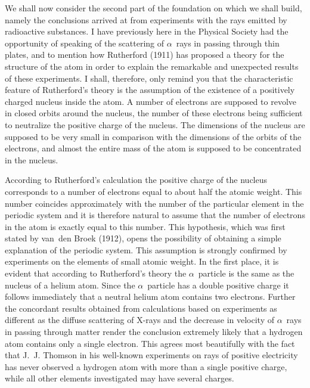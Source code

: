  We shall now consider the
second part of the foundation on which we shall build, namely the
conclusions arrived at from experiments with the rays emitted by
radioactive substances. I have previously here in the Physical
Society had the opportunity of speaking of the scattering of $\alpha$~rays
in passing through thin plates, and to mention how Rutherford
(1911) has proposed a theory for the structure of the atom in
order to explain the remarkable and unexpected results of these
experiments. I shall, therefore, only remind you that the characteristic
feature of Rutherford's theory is the assumption of the
existence of a positively charged nucleus inside the atom. A number
of electrons are supposed to revolve in closed orbits around the
nucleus, the number of these electrons being sufficient to neutralize
the positive charge of the nucleus. The dimensions of the nucleus
are supposed to be very small in comparison with the dimensions
of the orbits of the electrons, and almost the entire mass of the
atom is supposed to be concentrated in the nucleus.


According to Rutherford's calculation the positive charge of the
nucleus corresponds to a number of electrons equal to about half
the atomic weight. This number coincides approximately with the
number of the particular element in the periodic system and it is
therefore natural to assume that the number of electrons in the
atom is exactly equal to this number. This hypothesis, which was
first stated by van~den Broek (1912), opens the possibility of
obtaining a simple explanation of the periodic system. This assumption
is strongly confirmed by experiments on the elements
of small atomic weight. In the first place, it is evident that according
to Rutherford's theory the $\alpha$~particle is the same as the
nucleus of a helium atom. Since the $\alpha$~particle has a double positive
charge it follows immediately that a neutral helium atom contains
two electrons. Further the concordant results obtained from calculations
based on experiments as different as the diffuse scattering
of X-rays and the decrease in velocity of $\alpha$~rays in passing
through matter render the conclusion extremely likely that a
hydrogen atom contains only a single electron. This agrees most
beautifully with the fact that J.~J. Thomson in his well-known
experiments on rays of positive electricity has never observed a
hydrogen atom with more than a single positive charge, while all
other elements investigated may have several charges.

